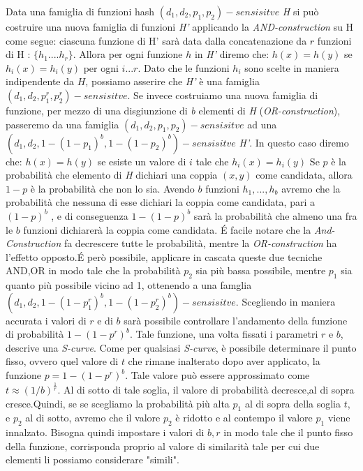 Data una famiglia di funzioni hash $(d_1,d_2,p_1,p_2)-sensisitve$ \emph{H} si può costruire una nuova famiglia di funzioni \emph{H'} applicando la \emph{AND-construction} su H come segue: ciascuna funzione di H' sarà data dalla concatenazione  da $r$ funzioni di H : $\lbrace h_1....h_r \rbrace $. Allora per ogni funzione $h$ in \emph{H'} diremo che: $h(x)=h(y)$ se $h_i(x)=h_i(y)$ per ogni $i...r$.  Dato che le funzioni $h_i$ sono scelte in maniera indipendente da $H$, possiamo asserire che \emph{H'} è una famiglia $(d_1,d_2,p_1^r,p_2^r)-sensisitve$.
Se invece costruiamo una nuova famiglia di funzione, per mezzo di una disgiunzione di \emph{b} elementi  di \emph{H} (\emph{OR-construction}), passeremo da una famiglia  $(d_1,d_2,p_1,p_2)-sensisitve$ ad una  $(d_1,d_2,1-(1-p_1)^b,1-(1-p_2)^b)-sensisitve$ \emph{H'}. In questo caso diremo che: $h(x)=h(y)$ se esiste  un valore di $i$ tale che $h_i(x)=h_i(y)$ 
Se $p$ è la probabilità che elemento di \emph{H} dichiari una coppia $(x,y)$ come candidata, allora $1-p$ è la probabilità che non lo sia. Avendo $b$ funzioni $h_1,...,h_b$ avremo che la probabilità che nessuna di esse dichiari la coppia come candidata, pari a   $(1-p)^b$ , e di conseguenza $1-(1-p)^b$ sarà la probabilità che almeno una fra le $b$ funzioni dichiarerà la coppia come candidata.
\'E facile notare che la \emph{And-Construction} fa decrescere tutte le probabilità, mentre la \emph{OR-construction} ha l'effetto opposto.\'E però possibile, applicare in cascata queste due tecniche AND,OR in modo tale che la probabilità $p_2$ sia più bassa possibile, mentre $p_1$ sia quanto più possibile vicino ad 1, ottenendo a una famglia $(d_1,d_2,1-(1-p_1^r)^b,1-(1-p_2^r)^b)-sensisitve$. Scegliendo in maniera accurata i valori di $r$ e di $b$ sarà possibile controllare l'andamento della funzione di probabilità $1-(1-p^r)^b$.
Tale funzione, una volta fissati i parametri $r$ e $b$, descrive una \emph{S-curve}. Come per qualsiasi \emph{S-curve}, è possibile determinare il punto fisso, ovvero quel valore di $t$ che rimane inalterato dopo aver applicato, la funzione $p=1-(1-p^r)^b$. Tale valore può essere approssimato come $t\approx (1/b)^\frac{1}{r}$. Al di sotto di tale soglia, il valore di probabilità decresce,al di sopra cresce.Quindi, se  se scegliamo la probabilità più alta $p_1$ al di sopra della soglia $t$, e $p_2$ al di sotto, avremo che il valore  $p_2$ è ridotto e al contempo il valore $p_1$ viene innalzato. Bisogna quindi impostare i valori di $b,r$ in modo tale che il punto fisso della funzione, corrisponda proprio al valore di similarità tale per cui due elementi li possiamo considerare "simili".
